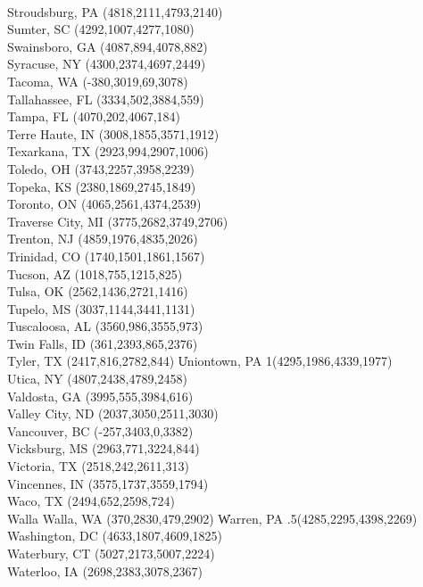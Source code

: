 \\Stroudsburg, PA  (4818,2111,4793,2140)
\\Sumter, SC  (4292,1007,4277,1080)
\\Swainsboro, GA (4087,894,4078,882)
\\Syracuse, NY (4300,2374,4697,2449)
\\Tacoma, WA (-380,3019,69,3078)
\\Tallahassee, FL (3334,502,3884,559)
\\Tampa, FL (4070,202,4067,184)
\\Terre Haute, IN (3008,1855,3571,1912)
\\Texarkana, TX  (2923,994,2907,1006)
\\Toledo, OH (3743,2257,3958,2239)
\\Topeka, KS (2380,1869,2745,1849)
\\Toronto, ON  (4065,2561,4374,2539)
\\Traverse City, MI  (3775,2682,3749,2706)
\\Trenton, NJ (4859,1976,4835,2026)
\\Trinidad, CO  (1740,1501,1861,1567)
\\Tucson, AZ  (1018,755,1215,825)
\\Tulsa, OK (2562,1436,2721,1416)
\\Tupelo, MS (3037,1144,3441,1131)
\\Tuscaloosa, AL  (3560,986,3555,973)
\\Twin Falls, ID (361,2393,865,2376)
\\Tyler, TX  (2417,816,2782,844)
\|Uniontown, PA 1(4295,1986,4339,1977)
\\Utica, NY  (4807,2438,4789,2458)
\\Valdosta, GA (3995,555,3984,616)
\\Valley City, ND (2037,3050,2511,3030)
\\Vancouver, BC  (-257,3403,0,3382)
\\Vicksburg, MS  (2963,771,3224,844)
\\Victoria, TX  (2518,242,2611,313)
\\Vincennes, IN (3575,1737,3559,1794)
\\Waco, TX  (2494,652,2598,724)
\\Walla Walla, WA  (370,2830,479,2902)
\|Warren, PA .5(4285,2295,4398,2269)
\\Washington, DC  (4633,1807,4609,1825)
\\Waterbury, CT  (5027,2173,5007,2224)
\\Waterloo, IA (2698,2383,3078,2367)
